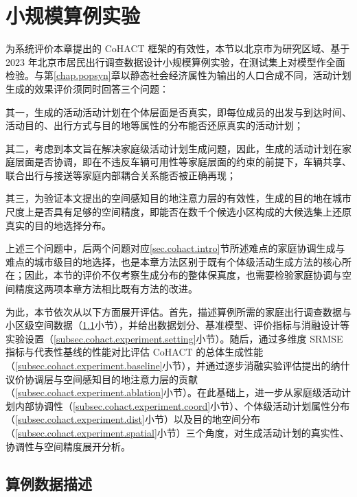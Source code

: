  
\section{小规模算例实验}\label{sec.cohact.experiment}

为系统评价本章提出的 CoHACT 框架的有效性，本节以北京市为研究区域、基于 2023 年北京市居民出行调查数据设计小规模算例实验，在测试集上对模型作全面检验。与第\ref{chap.popsyn}章以静态社会经济属性为输出的人口合成不同，活动计划生成的效果评价须同时回答三个问题：

其一，生成的活动活动计划在个体层面是否真实，即每位成员的出发与到达时间、活动目的、出行方式与目的地等属性的分布能否还原真实的活动计划；

其二，考虑到本文旨在解决家庭级活动计划生成问题，因此，生成的活动计划在家庭层面是否协调，即在不违反车辆可用性等家庭层面的约束的前提下，车辆共享、联合出行与接送等家庭内部耦合关系能否被正确再现；

其三，为验证本文提出的空间感知目的地注意力层的有效性，生成的目的地在城市尺度上是否具有足够的空间精度，即能否在数千个候选小区构成的大候选集上还原真实的目的地选择分布。

上述三个问题中，后两个问题对应\ref{sec.cohact.intro}节所述难点的家庭协调生成与难点的城市级目的地选择，也是本章方法区别于既有个体级活动生成方法的核心所在；因此，本节的评价不仅考察生成分布的整体保真度，也需要检验家庭协调与空间精度这两项本章方法相比既有方法的改进。

为此，本节依次从以下方面展开评估。首先，描述算例所需的家庭出行调查数据与小区级空间数据（\ref{subsec.cohact.experiment.data}小节），并给出数据划分、基准模型、评价指标与消融设计等实验设置（\ref{subsec.cohact.experiment.setting}小节）。随后，通过多维度 SRMSE 指标与代表性基线的性能对比评估 CoHACT 的总体生成性能（\ref{subsec.cohact.experiment.baseline}小节），并通过逐步消融实验评估提出的纳什议价协调层与空间感知目的地注意力层的贡献（\ref{subsec.cohact.experiment.ablation}小节）。在此基础上，进一步从家庭级活动计划内部协调性（\ref{subsec.cohact.experiment.coord}小节）、个体级活动计划属性分布（\ref{subsec.cohact.experiment.dist}小节）以及目的地空间分布（\ref{subsec.cohact.experiment.spatial}小节）三个角度，对生成活动计划的真实性、协调性与空间精度展开分析。

\subsection{算例数据描述}\label{subsec.cohact.experiment.data}

